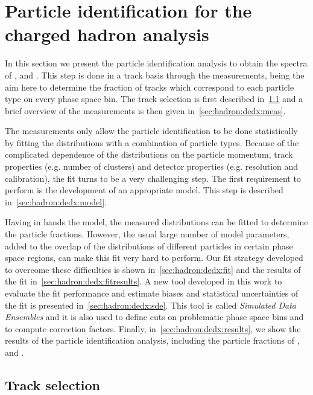 \section{Particle identification for the charged hadron analysis}
\label{sec:hadron:dedx}

In this section we present the particle identification
analysis to obtain the spectra of \pions, \kaons and \protonpm.
This step is done in a track basis through the \dedx measurements,
being the aim here to determine the fraction of tracks which
correspond to each particle type on every phase space bin.
The track selection is first described in~\cref{sec:hadron:dedx:selection}
and a brief overview of the \dedx measurements is then given
in~\cref{sec:hadron:dedx:meas}.

The \dedx measurements only allow the particle identification
to be done statistically by fitting
the \dedx distributions with a combination of particle
types. Because of the complicated dependence of the \dedx
distributions on the particle momentum,
track properties (e.g. number of clusters) and
detector properties (e.g. resolution and calibration),
the \dedx fit turns to be a very challenging step.
The first requirement to perform is the development
of an appropriate \dedx model. This step is described in~\cref{sec:hadron:dedx:model}.

Having in hands the \dedx model, the measured \dedx
distributions can be fitted to determine the particle
fractions. However, the usual large number of
model parameters, added to the
overlap of the \dedx distributions
of different particles in certain phase space regions,
can make this fit very hard to perform.
Our fit strategy developed to overcome these difficulties is shown
in~\cref{sec:hadron:dedx:fit} and the results
of the fit in~\cref{sec:hadron:dedx:fitresults}. A new tool
developed in this work to evaluate the fit performance
and estimate biases and statistical uncertainties of the fit
is presented in~\cref{sec:hadron:dedx:sde}. This
tool is called \emph{Simulated Data Ensembles} and
it is also used to define cuts on problematic
phase space bins and to compute correction factors.
Finally, in~\cref{sec:hadron:dedx:results}, we show the results
of the particle identification analysis, including
the particle fractions of \pions, \kaons and \protonpm.


\subsection{Track selection}
\label{sec:hadron:dedx:selection}

